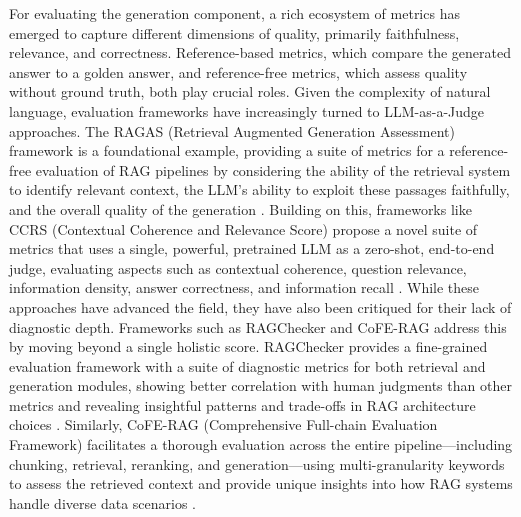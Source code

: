 \documentclass[11pt]{article}
\begin{document}
For evaluating the generation component, a rich ecosystem of metrics has emerged to capture different dimensions of quality, primarily faithfulness, relevance, and correctness. Reference-based metrics, which compare the generated answer to a golden answer, and reference-free metrics, which assess quality without ground truth, both play crucial roles. Given the complexity of natural language, evaluation frameworks have increasingly turned to LLM-as-a-Judge approaches. The RAGAS (Retrieval Augmented Generation Assessment) framework is a foundational example, providing a suite of metrics for a reference-free evaluation of RAG pipelines by considering the ability of the retrieval system to identify relevant context, the LLM's ability to exploit these passages faithfully, and the overall quality of the generation \cite{ref405}. Building on this, frameworks like CCRS (Contextual Coherence and Relevance Score) propose a novel suite of metrics that uses a single, powerful, pretrained LLM as a zero-shot, end-to-end judge, evaluating aspects such as contextual coherence, question relevance, information density, answer correctness, and information recall \cite{ref406}. While these approaches have advanced the field, they have also been critiqued for their lack of diagnostic depth. Frameworks such as RAGChecker and CoFE-RAG address this by moving beyond a single holistic score. RAGChecker provides a fine-grained evaluation framework with a suite of diagnostic metrics for both retrieval and generation modules, showing better correlation with human judgments than other metrics and revealing insightful patterns and trade-offs in RAG architecture choices \cite{ref407}. Similarly, CoFE-RAG (Comprehensive Full-chain Evaluation Framework) facilitates a thorough evaluation across the entire pipeline---including chunking, retrieval, reranking, and generation---using multi-granularity keywords to assess the retrieved context and provide unique insights into how RAG systems handle diverse data scenarios \cite{ref408}.
\end{document}
